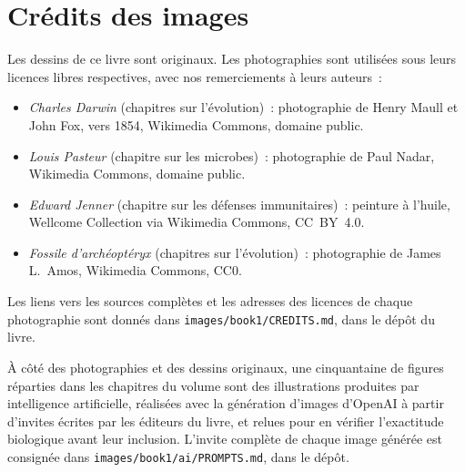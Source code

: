 \chapter*{Crédits des images}

Les dessins de ce livre sont originaux. Les photographies sont
utilisées sous leurs licences libres respectives, avec nos
remerciements à leurs auteurs~:

\begin{itemize}
  \item \emph{Charles Darwin} (chapitres sur l'évolution)~:
        photographie de Henry Maull et John Fox, vers 1854, Wikimedia
        Commons, domaine public.
  \item \emph{Louis Pasteur} (chapitre sur les microbes)~:
        photographie de Paul Nadar, Wikimedia Commons, domaine public.
  \item \emph{Edward Jenner} (chapitre sur les défenses immunitaires)~:
        peinture à l'huile, Wellcome Collection via Wikimedia Commons,
        CC~BY~4.0.
  \item \emph{Fossile d'archéoptéryx} (chapitres sur l'évolution)~:
        photographie de James L.~Amos, Wikimedia Commons, CC0.
\end{itemize}

Les liens vers les sources complètes et les adresses des licences de
chaque photographie sont donnés dans
\texttt{images/book1/CREDITS.md}, dans le dépôt du livre.

\bigskip
À côté des photographies et des dessins originaux, une cinquantaine de
figures réparties dans les chapitres du volume sont des illustrations
produites par intelligence artificielle, réalisées avec la génération
d'images d'OpenAI à partir d'invites écrites par les éditeurs du livre,
et relues pour en vérifier l'exactitude biologique avant leur
inclusion. L'invite complète de chaque image générée est consignée dans
\texttt{images/book1/ai/PROMPTS.md}, dans le dépôt.
\clearpage
